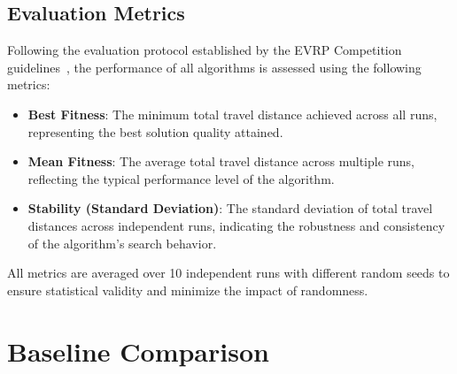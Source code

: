 \subsection{Evaluation Metrics}

Following the evaluation protocol established by the EVRP Competition guidelines~\cite{TR-EVRP-Competition}, the performance of all algorithms is assessed using the following metrics:

\begin{itemize}
    \item \textbf{Best Fitness}: The minimum total travel distance achieved across all runs, representing the best solution quality attained.
    
    \item \textbf{Mean Fitness}: The average total travel distance across multiple runs, reflecting the typical performance level of the algorithm.
    
    \item \textbf{Stability (Standard Deviation)}: The standard deviation of total travel distances across independent runs, indicating the robustness and consistency of the algorithm's search behavior.
\end{itemize}

All metrics are averaged over 10 independent runs with different random seeds to ensure statistical validity and minimize the impact of randomness.

\section{Baseline Comparison}
